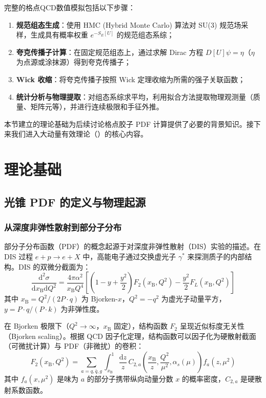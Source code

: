 \documentclass[11pt,a4paper]{ctexart}
\newcommand{\LaMET}{\text{LaMET}}
\begin{document}
完整的格点QCD数值模拟包括以下步骤：
\begin{enumerate}
  \item \textbf{规范组态生成}：使用 HMC (Hybrid Monte Carlo) 算法对 SU(3) 规范场采样，生成具有概率权重 $e^{-S_E[U]}$ 的规范组态系综；
  \item \textbf{夸克传播子计算}：在固定规范组态上，通过求解 Dirac 方程 $D[U] \psi = \eta$（$\eta$ 为点源或涂抹源）得到夸克传播子；
  \item \textbf{Wick 收缩}：将夸克传播子按照 Wick 定理收缩为所需的强子关联函数；
  \item \textbf{统计分析与物理提取}：对组态系综求平均，利用拟合方法提取物理观测量（质量、矩阵元等），并进行连续极限和手征外推。
\end{enumerate}

本节建立的理论基础为后续讨论格点胶子 PDF 计算提供了必要的背景知识。接下来我们进入大动量有效理论（\LaMET）的核心内容。

\section{理论基础}

\subsection{光锥 PDF 的定义与物理起源}

\subsubsection{从深度非弹性散射到部分子分布}

部分子分布函数（PDF）的概念起源于对深度非弹性散射（DIS）实验的描述。在 DIS 过程 $e + p \to e + X$ 中，高能电子通过交换虚光子 $\gamma^*$ 来探测质子的内部结构。DIS 的双微分截面为：
\begin{equation}
\frac{\mathrm{d}^2\sigma}{\mathrm{d}x_{\text{B}} \mathrm{d}Q^2} = \frac{4\pi\alpha^2}{x_{\text{B}} Q^4} \left[ \left(1 - y + \frac{y^2}{2}\right) F_2(x_{\text{B}}, Q^2) - \frac{y^2}{2} F_L(x_{\text{B}},Q^2) \right]
\end{equation}
其中 $x_{\text{B}} = Q^2/(2P\cdot q)$ 为 Bjorken-$x$，$Q^2 = -q^2$ 为虚光子动量平方，$y = P\cdot q/(P\cdot k)$ 为非弹性度。

在 Bjorken 极限下（$Q^2 \to \infty$，$x_{\text{B}}$ 固定），结构函数 $F_2$ 呈现近似标度无关性（Bjorken scaling）。根据 QCD 因子化定理，结构函数可以因子化为硬散射截面（可微扰计算）与 PDF（非微扰）的卷积：
\begin{equation}
F_2(x_{\text{B}}, Q^2) = \sum_{a=q,\bar{q},g} \int_{x_{\text{B}}}^{1} \frac{\mathrm{d}z}{z} \,
C_{2,a}\!\left(\frac{x_{\text{B}}}{z}, \frac{Q^2}{\mu^2}, \alpha_s(\mu)\right) f_a(z, \mu^2)
\end{equation}
其中 $f_a(x, \mu^2)$ 是味为 $a$ 的部分子携带纵向动量分数 $x$ 的概率密度，$C_{2,a}$ 是硬散射系数函数。
\end{document}
